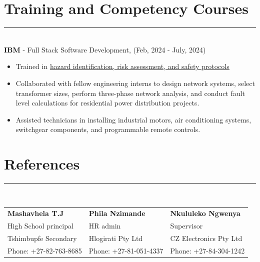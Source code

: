 \documentclass[12pt]{article}
\begin{document}
\vspace{-5mm}\section*{\fontsize{14}{1}\selectfont\color{color_29791}Training and Competency Courses}\vspace{-9pt} 
\rule{\textwidth}{0.4pt}
\vspace{2pt}
\\\textbf{IBM} - Full Stack Software Development, (Feb, 2024 - July, 2024)
\vspace{-3mm}
\begin{itemize}
  \item Trained in \href{https://drive.google.com/file/d/1i5SDy8WoBzwGOmAEAcxJzVyCb1c7Gfqq/view?usp=sharing}{\underline{hazard identification, risk assessment, and safety protocols}}
  \vspace{-3mm}
  \item Collaborated with fellow engineering interns to design network systems, select transformer sizes, perform three-phase network analysis, and conduct fault level calculations for residential power distribution projects.
  \vspace{-3mm}
  \item Assisted technicians in installing industrial motors, air conditioning systems, switchgear components, and programmable remote controls.
\end{itemize}

\vspace{0mm}\section*{\fontsize{14}{1}\selectfont\color{color_29791}References}\vspace{-9pt} 
\rule{\textwidth}{0.4pt}
\vspace{2pt}\\
\begin{tabular}{p{} p{} p{}}
  \textbf{Mashavhela T.J} & 
  \textbf{Phila Nzimande} & 
  \textbf{Nkululeko Ngwenya} \\
  High School principal & 
  HR admin& 
  Supervisor\\
  Tshimbupfe Secondary & 
  Hlogirati Pty Ltd& 
  CZ Electronics Pty Ltd\\ 
  Phone: +27-82-763-8685  & 
  Phone: +27-81-051-4337 & 
  Phone: +27-84-304-1242 \\
\end{tabular}
\end{document}
